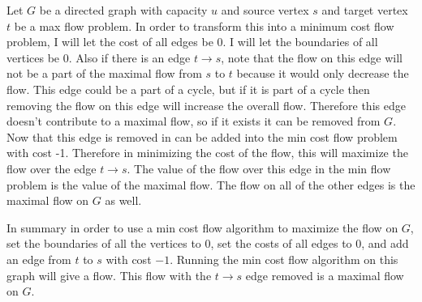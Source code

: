 \documentclass[11pt, oneside]{article}
\begin{document}
\begin{enumerate}
    Let $G$ be a directed graph with capacity $u$ and source vertex $s$ and
    target vertex $t$ be a max flow problem.
    In order to transform this into a minimum cost flow problem, I will let the
    cost of all edges be $0$.
    I will let the boundaries of all vertices be $0$.
    Also if there is an edge $t \to s$, note that the flow on this edge will not
    be a part of the maximal flow from $s$ to $t$ because it would only decrease
    the flow.
    This edge could be a part of a cycle, but if it is part of a cycle then
    removing the flow on this edge will increase the overall flow.
    Therefore this edge doesn't contribute to a maximal flow, so if it exists it
    can be removed from $G$.
    Now that this edge is removed in can be added into the min cost flow problem
    with cost -1.
    Therefore in minimizing the cost of the flow, this will maximize the flow
    over the edge $t \to s$.
    The value of the flow over this edge in the min flow problem is the value of
    the maximal flow.
    The flow on all of the other edges is the maximal flow on $G$ as well.

    In summary in order to use a min cost flow algorithm to maximize the flow on
    $G$, set the boundaries of all the vertices to $0$, set the costs of all
    edges to $0$, and add an edge from $t$ to $s$ with cost $-1$.
    Running the min cost flow algorithm on this graph will give a flow.
    This flow with the $t \to s$ edge removed is a maximal flow on $G$.

\end{enumerate}
\end{document}
